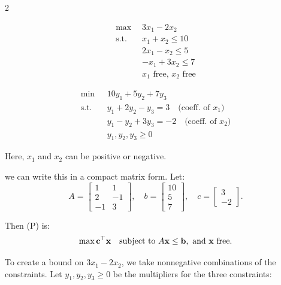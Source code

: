 \begin{multicols}{2}
\begin{tcolorbox}[title=Primal (P), colback=blue!5, colframe=blue!60!black, sharp corners=south]
\[
\begin{aligned}
\max\ & 3x_1 - 2x_2 \\
\text{s.t.} \quad 
& x_1 + x_2 \leq 10 \\
& 2x_1 - x_2 \leq 5 \\
& -x_1 + 3x_2 \leq 7 \\
& x_1 \text{ free, } x_2 \text{ free}
\end{aligned}
\]
\end{tcolorbox}

\columnbreak

\begin{tcolorbox}[title=Dual (D), colback=green!5, colframe=green!60!black, sharp corners=south]
\[
\begin{aligned}
\min\ & 10y_1 + 5y_2 + 7y_3 \\
\text{s.t.} \quad 
& y_1 + 2y_2 - y_3 = 3 \quad \text{(coeff. of } x_1) \\
& y_1 - y_2 + 3y_3 = -2 \quad \text{(coeff. of } x_2) \\
& y_1, y_2, y_3 \geq 0
\end{aligned}
\]
\end{tcolorbox}
\end{multicols}

Here, $x_1$ and $x_2$ can be positive or negative. 

we can write this in a compact matrix form. Let:
\[
A = \begin{bmatrix}
1 & 1 \\
2 & -1 \\
-1 & 3 
\end{bmatrix}, \quad b = \begin{bmatrix}
10 \\ 5 \\ 7
\end{bmatrix}, \quad c = \begin{bmatrix}
3 \\ -2
\end{bmatrix}.
\]

Then (P) is:
\[
\max \mathbf{c}^\top \mathbf{x} \quad \mbox{subject to } A \mathbf{x} \leq \mathbf{b}, \mbox{ and } \mathbf{x} \mbox{ free}.
\]



To create a bound on $3x_1 - 2x_2$, we take nonnegative combinations of the constraints. Let $y_1, y_2, y_3 \geq 0$ be the multipliers for the three constraints:


